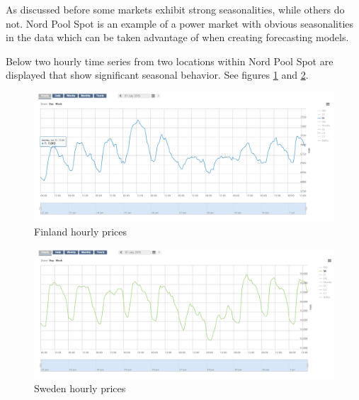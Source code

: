 



As discussed before some markets exhibit strong seasonalities, while others do not. Nord Pool Spot is an example of a power market with obvious seasonalities in the data which can be taken advantage of when creating forecasting models. 

Below two hourly time series from two locations within Nord Pool Spot are displayed that show significant seasonal behavior. 
See figures \ref{fig:hourly_prices_finland} and \ref{fig:hourly_prices_sweden}.

\begin{figure}[!h]
	\centering
		\includegraphics[width=1.00\textwidth]{figures/methodology/hourly_prices_finland.PNG}
	\caption{Finland hourly prices}
	\label{fig:hourly_prices_finland}
\end{figure}

\begin{figure}[!h]
	\centering
		\includegraphics[width=1.00\textwidth]{figures/methodology/hourly_prices_sweden.PNG}
	\caption{Sweden hourly prices}
	\label{fig:hourly_prices_sweden}
\end{figure}




